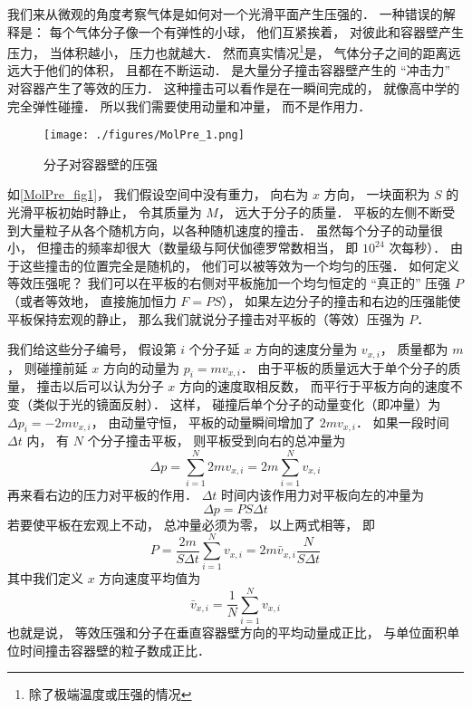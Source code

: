 

我们来从微观的角度考察气体是如何对一个光滑平面产生压强的． 一种错误的解释是： 每个气体分子像一个有弹性的小球， 他们互紧挨着， 对彼此和容器壁产生压力， 当体积越小， 压力也就越大． 然而真实情况\footnote{除了极端温度或压强的情况}是， 气体分子之间的距离远远大于他们的体积， 且都在不断运动． 是大量分子撞击容器壁产生的 “冲击力” 对容器产生了等效的压力． 这种撞击可以看作是在一瞬间完成的， 就像高中学的完全弹性碰撞． 所以我们需要使用动量和冲量， 而不是作用力．

\begin{figure}[ht]
\centering
\texttt{[image: ./figures/MolPre\_1.png]}
\caption{分子对容器壁的压强} \label{MolPre_fig1}
\end{figure}

如\autoref{MolPre_fig1}， 我们假设空间中没有重力， 向右为 $x$ 方向， 一块面积为 $S$ 的光滑平板初始时静止， 令其质量为 $M$， 远大于分子的质量． 平板的左侧不断受到大量粒子从各个随机方向，以各种随机速度的撞击． 虽然每个分子的动量很小， 但撞击的频率却很大（数量级与阿伏伽德罗常数相当， 即 $10^{24}$ 次每秒）． 由于这些撞击的位置完全是随机的， 他们可以被等效为一个均匀的压强． 如何定义等效压强呢？ 我们可以在平板的右侧对平板施加一个均匀恒定的 “真正的” 压强 $P$ （或者等效地， 直接施加恒力 $F = PS$）， 如果左边分子的撞击和右边的压强能使平板保持宏观的静止， 那么我们就说分子撞击对平板的（等效）压强为 $P$．

我们给这些分子编号， 假设第 $i$ 个分子延 $x$ 方向的速度分量为 $v_{x,i}$， 质量都为 $m$， 则碰撞前延 $x$ 方向的动量为 $p_i = m v_{x,i}$． 由于平板的质量远大于单个分子的质量， 撞击以后可以认为分子 $x$ 方向的速度取相反数， 而平行于平板方向的速度不变（类似于光的镜面反射）． 这样， 碰撞后单个分子的动量变化（即冲量）为 $\Delta p_i = -2mv_{x,i}$， 由动量守恒， 平板的动量瞬间增加了 $2mv_{x,i}$． 如果一段时间 $\Delta t$ 内， 有 $N$ 个分子撞击平板， 则平板受到向右的总冲量为
\begin{equation}
\Delta p = \sum_{i=1}^N 2mv_{x,i} = 2m \sum_{i=1}^N v_{x,i}
\end{equation}
再来看右边的压力对平板的作用． $\Delta t$ 时间内该作用力对平板向左的冲量为
\begin{equation}\label{MolPre_eq1}
\Delta p = PS \Delta t
\end{equation}
若要使平板在宏观上不动， 总冲量必须为零， 以上两式相等， 即
\begin{equation}
P = \frac{2m}{S\Delta t} \sum_{i=1}^N v_{x,i} = 2m\bar v_{x,i} \frac{N}{S\Delta t}
\end{equation}
其中我们定义 $x$ 方向速度平均值为
\begin{equation}\label{MolPre_eq2}
\bar v_{x,i} = \frac{1}{N}\sum_{i=1}^N v_{x,i}
\end{equation}
也就是说， 等效压强和分子在垂直容器壁方向的平均动量成正比， 与单位面积单位时间撞击容器壁的粒子数成正比．


